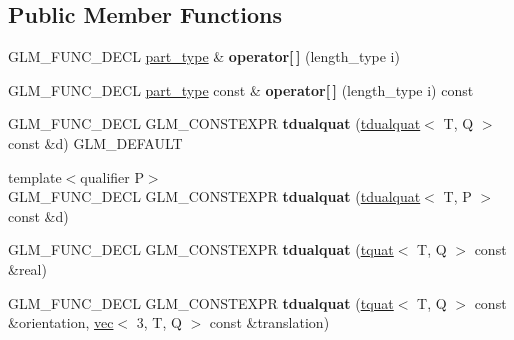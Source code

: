 \subsection*{Public Member Functions}
\begin{DoxyCompactItemize}
\item 
\mbox{\label{structglm_1_1tdualquat_a23ea50ee4bf311b8d37155ebec56dd90}} 
G\+L\+M\+\_\+\+F\+U\+N\+C\+\_\+\+D\+E\+CL \hyperlink{structglm_1_1tquat}{part\+\_\+type} \& {\bfseries operator\mbox{[}$\,$\mbox{]}} (length\+\_\+type i)
\item 
\mbox{\label{structglm_1_1tdualquat_a8a6db73181f9b7cba58d95704734f8e4}} 
G\+L\+M\+\_\+\+F\+U\+N\+C\+\_\+\+D\+E\+CL \hyperlink{structglm_1_1tquat}{part\+\_\+type} const  \& {\bfseries operator\mbox{[}$\,$\mbox{]}} (length\+\_\+type i) const
\item 
\mbox{\label{structglm_1_1tdualquat_ad6099c663113c443a9efeeabbd321bd1}} 
G\+L\+M\+\_\+\+F\+U\+N\+C\+\_\+\+D\+E\+CL G\+L\+M\+\_\+\+C\+O\+N\+S\+T\+E\+X\+PR {\bfseries tdualquat} (\hyperlink{structglm_1_1tdualquat}{tdualquat}$<$ T, Q $>$ const \&d) G\+L\+M\+\_\+\+D\+E\+F\+A\+U\+LT
\item 
\mbox{\label{structglm_1_1tdualquat_a23b9100d907a648204929a4c3392a56a}} 
{\footnotesize template$<$qualifier P$>$ }\\G\+L\+M\+\_\+\+F\+U\+N\+C\+\_\+\+D\+E\+CL G\+L\+M\+\_\+\+C\+O\+N\+S\+T\+E\+X\+PR {\bfseries tdualquat} (\hyperlink{structglm_1_1tdualquat}{tdualquat}$<$ T, P $>$ const \&d)
\item 
\mbox{\label{structglm_1_1tdualquat_aca6bbe930bd0b26c217b535fe06df688}} 
G\+L\+M\+\_\+\+F\+U\+N\+C\+\_\+\+D\+E\+CL G\+L\+M\+\_\+\+C\+O\+N\+S\+T\+E\+X\+PR {\bfseries tdualquat} (\hyperlink{structglm_1_1tquat}{tquat}$<$ T, Q $>$ const \&real)
\item 
\mbox{\label{structglm_1_1tdualquat_aedfbe6fe7039943ccbf7d178731fa9b7}} 
G\+L\+M\+\_\+\+F\+U\+N\+C\+\_\+\+D\+E\+CL G\+L\+M\+\_\+\+C\+O\+N\+S\+T\+E\+X\+PR {\bfseries tdualquat} (\hyperlink{structglm_1_1tquat}{tquat}$<$ T, Q $>$ const \&orientation, \hyperlink{structglm_1_1vec}{vec}$<$ 3, T, Q $>$ const \&translation)

\end{DoxyCompactItemize}
